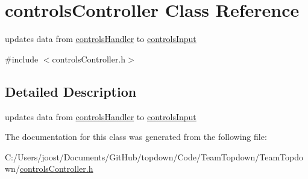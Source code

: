 \hypertarget{classcontrols_controller}{}\section{controls\+Controller Class Reference}
\label{classcontrols_controller}


updates data from \hyperlink{classcontrols_handler}{controls\+Handler} to \hyperlink{classcontrols_input}{controls\+Input}  




{\ttfamily \#include $<$controls\+Controller.\+h$>$}



\subsection{Detailed Description}
updates data from \hyperlink{classcontrols_handler}{controls\+Handler} to \hyperlink{classcontrols_input}{controls\+Input} 

The documentation for this class was generated from the following file\+:\begin{DoxyCompactItemize}
\item 
C\+:/\+Users/joost/\+Documents/\+Git\+Hub/topdown/\+Code/\+Team\+Topdown/\+Team\+Topdown/\hyperlink{controls_controller_8h}{controls\+Controller.\+h}\end{DoxyCompactItemize}
